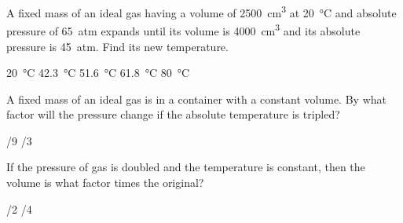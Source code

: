 \documentclass{../../../oss-ap12ibhl-print}
\begin{document}
\begin{questions}
  \question A fixed mass of an ideal gas having a volume of \SI{2500}{cm^3} at
  \SI{20}{\celsius} and absolute pressure of \SI{65}{atm} expands until its
  volume is \SI{4000}{cm^3} and its absolute pressure is \SI{45}{atm}. Find its
  new temperature.
  \begin{choices}
    \choice\SI{20}{\celsius}
    \choice\SI{42.3}{\celsius}
    \choice\SI{51.6}{\celsius}
    \choice\SI{61.8}{\celsius}
    \choice\SI{80}{\celsius}
  \end{choices}

  \question A fixed mass of an ideal gas is in a container with a constant
  volume. By what factor will the pressure change if the absolute temperature is
  tripled?
  \begin{choices}
    /9
    /3
  \end{choices}

  \question If the pressure of gas is doubled and the temperature is constant,
  then the volume is what factor times the original?
  \begin{choices}
    /2
    /4
  \end{choices}
  \newpage
  




\end{questions}
\end{document}
